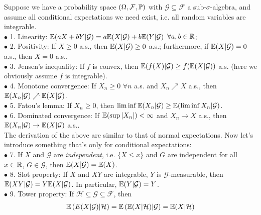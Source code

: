 \documentclass[a4paper]{article}
\begin{document}
\begin{thm}
    Suppose we have a probability space $(\Omega,\mathcal{F},\P)$ with $\mathcal{G} \subseteq \mathcal{F}$ a sub-$\sigma$-algebra, and assume all conditional expectations we need exist, i.e. all random variables are integrable.\\
    $\bullet$ 1. Linearity: $\E(aX+bY|\mathcal{G}) = a\E(X|\mathcal{G})+b\E(Y|\mathcal{G})$ $\forall a,b \in \R$;\\
    $\bullet$ 2. Positivity: If $X \geq 0$ a.s., then $\E(X|\mathcal{G}) \geq 0$ a.s.; furthermore, if $\E(X|\mathcal{G}) = 0$ a.s., then $X=0$ a.s..\\
    $\bullet$ 3. Jensen's inequality: If $f$ is convex, then $\E(f(X)|\mathcal{G}) \geq f(\E(X|\mathcal{G}))$ a.s. (here we obviously assume $f$ is integrable).\\
    $\bullet$ 4. Monotone convergence: If $X_n \geq 0$ $\forall n$ a.s. and $X_n \nearrow X$ a.s., then $\E(X_n | \mathcal{G}) \nearrow \E(X|\mathcal{G})$.\\
    $\bullet$ 5. Fatou's lemma: If $X_n \geq 0$, then $\liminf \E(X_n|\mathcal{G}) \geq \E(\liminf X_n|\mathcal{G})$.\\
    $\bullet$ 6. Dominated convergence: If $\E (\sup |X_n|) < \infty$ and $X_n \to X$ a.s., then $\E(X_n | \mathcal{G}) \to \E(X|\mathcal{G})$ a.s..\\
    The derivation of the above are similar to that of normal expectations. Now let's introduce something that's only for conditional expectations:\\
    $\bullet$ 7. If $X$ and $\mathcal{G}$ are \emph{independent}, i.e. $\{X \leq x\}$ and $G$ are independent for all $x \in \R$, $G \in \mathcal{G}$, then $\E(X|\mathcal{G}) = \E(X)$.\\
    $\bullet$ 8. Slot property: If $X$ and $XY$ are integrable, $Y$ is $\mathcal{G}$-measurable, then $\E(XY|\mathcal{G}) = Y\E(X|\mathcal{G})$. In particular, $\E(Y|\mathcal{G}) = Y$.\\
    $\bullet$ 9. Tower property: If $\mathcal{H} \subseteq \mathcal{G} \subseteq \mathcal{F}$, then
    \begin{equation*}
        \begin{aligned}
            \E\left(E(X|\mathcal{G})|\mathcal{H}\right) = \E\left(\E(X|\mathcal{H})|\mathcal{G}\right) = \E(X|\mathcal{H})
        \end{aligned}
    \end{equation*}
\end{thm}
\end{document}
